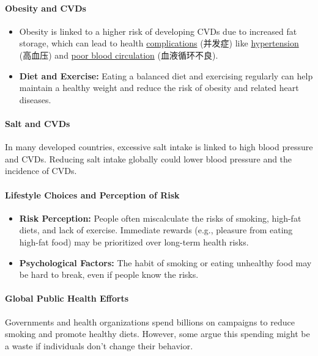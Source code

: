 \paragraph{Obesity and CVDs}
\begin{itemize}
    \item Obesity is linked to a higher risk of developing CVDs due to increased fat storage, which can lead to health
    \underline{complications} (并发症) like \underline{hypertension} (高血压) and \underline{poor blood circulation} (血液循环不良).
    \item \textbf{Diet and Exercise:} Eating a balanced diet and exercising regularly can help maintain a healthy weight and
    reduce the risk of obesity and related heart diseases.
\end{itemize}

\paragraph{Salt and CVDs}
In many developed countries, excessive salt intake is linked to high blood pressure and CVDs. Reducing salt intake globally could
lower blood pressure and the incidence of CVDs.

\paragraph{Lifestyle Choices and Perception of Risk}
\begin{itemize}
    \item \textbf{Risk Perception:} People often miscalculate the risks of smoking, high-fat diets, and lack of exercise.
    Immediate rewards (e.g., pleasure from eating high-fat food) may be prioritized over long-term health risks.
    \item \textbf{Psychological Factors:} The habit of smoking or eating unhealthy food may be hard to break, even if people know
    the risks.
\end{itemize}

\paragraph{Global Public Health Efforts}
Governments and health organizations spend billions on campaigns to reduce smoking and promote healthy diets. However, some argue
this spending might be a waste if individuals don't change their behavior.